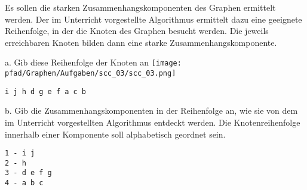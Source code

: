 \question[6]
Es sollen die starken Zusammenhangskomponenten des Graphen ermittelt werden.
Der im Unterricht vorgestellte Algorithmus ermittelt dazu eine
geeignete Reihenfolge, in der die Knoten des Graphen besucht werden. Die
jeweils erreichbaren Knoten bilden dann eine starke Zusammenhangskomponente.

a. Gib diese Reihenfolge der Knoten an
\texttt{[image: \\pfad/Graphen/Aufgaben/scc\_03/scc\_03.png]}
\begin{solutionbox}{2cm}
\begin{lstlisting}
i j h d g e f a c b
\end{lstlisting}
\end{solutionbox}

b. Gib die Zusammenhangskomponenten in der Reihenfolge an, wie sie von
dem im Unterricht vorgestellten Algorithmus entdeckt werden.
Die Knotenreihenfolge innerhalb einer Komponente soll
alphabetisch geordnet sein.
\begin{solutionbox}{4cm}
\begin{lstlisting}
1 - i j
2 - h
3 - d e f g
4 - a b c
\end{lstlisting}
\end{solutionbox}
